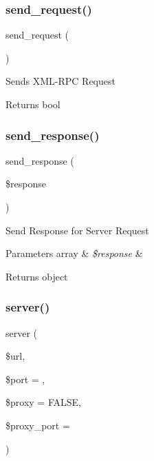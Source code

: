 \subsubsection{\texorpdfstring{send\+\_\+request()}{send\_request()}}
{\footnotesize\ttfamily send\+\_\+request (\begin{DoxyParamCaption}{ }\end{DoxyParamCaption})}

Sends X\+M\+L-\/\+R\+PC Request

\begin{DoxyReturn}{Returns}
bool 
\end{DoxyReturn}
\mbox{\label{class_c_i___xmlrpc_ac567feb54a4bda4cad24ff63d09267a1}} 
\subsubsection{\texorpdfstring{send\+\_\+response()}{send\_response()}}
{\footnotesize\ttfamily send\+\_\+response (\begin{DoxyParamCaption}\item[{}]{\$response }\end{DoxyParamCaption})}

Send Response for Server Request


\begin{DoxyParams}[1]{Parameters}
array & {\em \$response} & \\
\hline
\end{DoxyParams}
\begin{DoxyReturn}{Returns}
object 
\end{DoxyReturn}
\mbox{\label{class_c_i___xmlrpc_a9969815a7195f6915eb73afcab3f9e9e}} 
\subsubsection{\texorpdfstring{server()}{server()}}
{\footnotesize\ttfamily server (\begin{DoxyParamCaption}\item[{}]{\$url,  }\item[{}]{\$port = {},  }\item[{}]{\$proxy = {\ttfamily FALSE},  }\item[{}]{\$proxy\+\_\+port = {} }\end{DoxyParamCaption})}

